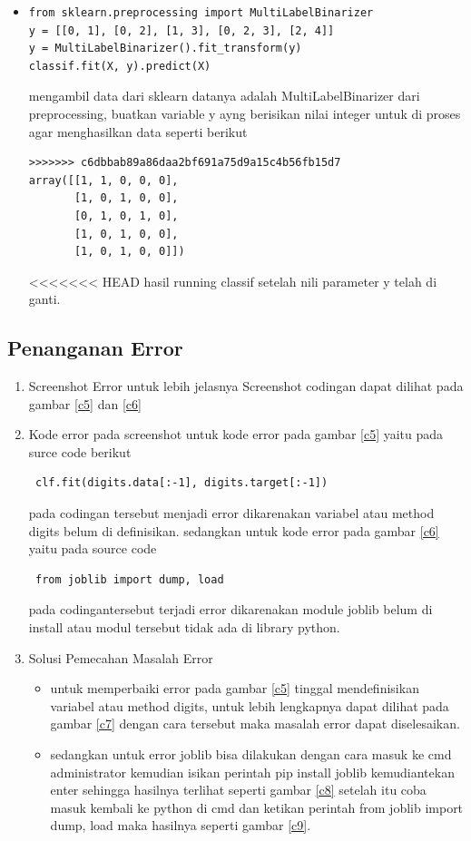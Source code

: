 \begin{enumerate}
\begin{itemize}
\begin{itemize}
\item
\begin{verbatim}
from sklearn.preprocessing import MultiLabelBinarizer
y = [[0, 1], [0, 2], [1, 3], [0, 2, 3], [2, 4]]
y = MultiLabelBinarizer().fit_transform(y)
classif.fit(X, y).predict(X)
\end{verbatim}
\subitem
mengambil data dari sklearn datanya adalah MultiLabelBinarizer dari preprocessing, buatkan variable y ayng berisikan nilai integer untuk di proses agar menghasilkan data seperti berikut
\begin{verbatim}
>>>>>>> c6dbbab89a86daa2bf691a75d9a15c4b56fb15d7
array([[1, 1, 0, 0, 0],
       [1, 0, 1, 0, 0],
       [0, 1, 0, 1, 0],
       [1, 0, 1, 0, 0],
       [1, 0, 1, 0, 0]])
\end{verbatim}
<<<<<<< HEAD
hasil running classif setelah nili parameter y telah di ganti.
\end{itemize}



\subsection{Penanganan Error}\par
\begin{enumerate}
\item
Screenshot Error
untuk lebih jelasnya Screenshot codingan dapat dilihat pada gambar \ref{c5} dan \ref{c6}
\item
Kode error pada screenshot
untuk kode error pada gambar \ref{c5} yaitu pada surce code berikut \begin{verbatim} clf.fit(digits.data[:-1], digits.target[:-1]) \end{verbatim} pada codingan tersebut menjadi error dikarenakan variabel atau method digits belum di definisikan.
sedangkan untuk kode error pada gambar \ref{c6} yaitu pada source code \begin{verbatim} from joblib import dump, load \end{verbatim}  pada codingantersebut terjadi error dikarenakan  module joblib belum di install atau modul tersebut tidak ada di library python.
\item
Solusi Pemecahan Masalah Error 
\begin{itemize}
\item
untuk memperbaiki error pada gambar \ref{c5} tinggal mendefinisikan variabel atau method digits, untuk lebih lengkapnya dapat dilihat pada gambar  \ref{c7} dengan cara tersebut maka masalah error dapat diselesaikan.
\item
sedangkan untuk error joblib bisa dilakukan dengan cara masuk ke cmd administrator kemudian isikan perintah pip install joblib kemudiantekan enter sehingga hasilnya terlihat seperti gambar \ref{c8} setelah itu coba masuk kembali ke python di cmd dan ketikan perintah from joblib import dump, load maka hasilnya seperti gambar \ref{c9}.
\end{itemize}
\end{enumerate}


\end{itemize}
\end{enumerate}
